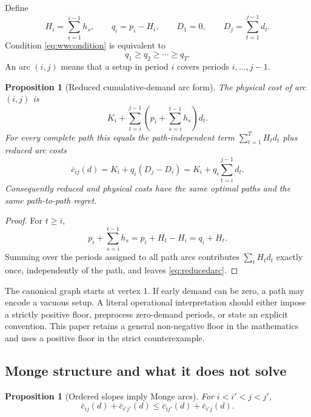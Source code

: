 \documentclass[11pt]{article}
\newtheorem{proposition}[theorem]{Proposition}
\theoremstyle{definition}
\begin{document}
Define
\[
H_i=\sum_{s=1}^{i-1}h_s,
\qquad
q_i=p_i-H_i,
\qquad
D_1=0,
\qquad
D_j=\sum_{t=1}^{j-1}d_t.
\]
Condition \eqref{eq:wwcondition} is equivalent to
\begin{equation}\label{eq:orderedq}
q_1\ge q_2\ge\cdots\ge q_T.
\end{equation}
An arc $(i,j)$ means that a setup in period $i$ covers periods $i,\ldots,j-1$.

\begin{proposition}[Reduced cumulative-demand arc form]\label{prop:reduction}
The physical cost of arc $(i,j)$ is
\[
K_i+\sum_{t=i}^{j-1}\left(p_i+\sum_{s=i}^{t-1}h_s\right)d_t.
\]
For every complete path this equals the path-independent term $\sum_{t=1}^T H_t d_t$ plus reduced arc costs
\begin{equation}\label{eq:reducedarc}
\bar c_{ij}(d)=K_i+q_i(D_j-D_i)
=K_i+q_i\sum_{t=i}^{j-1}d_t.
\end{equation}
Consequently reduced and physical costs have the same optimal paths and the same path-to-path regret.
\end{proposition}

\begin{proof}
For $t\ge i$,
\[
p_i+\sum_{s=i}^{t-1}h_s
=p_i+H_t-H_i=q_i+H_t.
\]
Summing over the periods assigned to all path arcs contributes $\sum_t H_t d_t$ exactly once, independently of the path, and leaves \eqref{eq:reducedarc}.
\end{proof}

The canonical graph starts at vertex 1. If early demand can be zero, a path may encode a vacuous setup. A literal operational interpretation should either impose a strictly positive floor, preprocess zero-demand periods, or state an explicit convention. This paper retains a general non-negative floor in the mathematics and uses a positive floor in the strict counterexample.

\subsection{Monge structure and what it does not solve}

\begin{proposition}[Ordered slopes imply Monge arcs]\label{prop:monge}
For $i<i'<j<j'$,
\begin{equation}\label{eq:monge}
\bar c_{ij}(d)+\bar c_{i'j'}(d)
\le
\bar c_{ij'}(d)+\bar c_{i'j}(d).
\end{equation}
\end{proposition}
\end{document}
